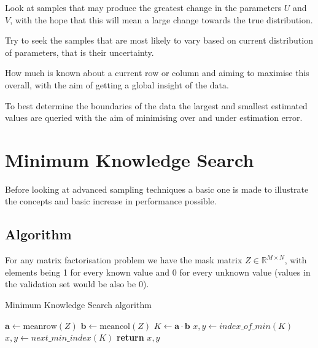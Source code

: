 \begin{description}[style=standard,leftmargin=.7cm,font=\bfseries]
  \item[Model] Look at samples that may produce the greatest change in the parameters $U$ and $V$, with the hope that this will mean a large change towards the true distribution.
  \item[Sample Uncertainty] Try to seek the samples that are most likely to vary based on current distribution of parameters, that is their uncertainty.
  \item[Knowledge] How much is known about a current row or column and aiming to maximise this overall, with the aim of getting a global insight of the data.
  \item[Max-Minimum] To best determine the boundaries of the data the largest and smallest estimated values are queried with the aim of minimising over and under estimation error.
\end{description}


\section{Minimum Knowledge Search}
\label{sec:mks_alg}
Before looking at advanced sampling techniques a basic one is made to illustrate the concepts and basic increase in performance possible.
\subsection{Algorithm}
For any matrix factorisation problem we have the mask matrix $Z \in \mathbb{R}^{M \times N}$, with elements being 1 for every known value and 0 for every unknown value (values in the validation set would be also be $0$).

\begin{algorithm}
\caption{Minimum Knowledge Search algorithm}\label{alg:min_knowl}
\begin{algorithmic}[1]
\State $\mathbf{a} \gets \text{meanrow}(Z)$ 
\State $\mathbf{b} \gets \text{meancol}(Z)$ 
\State $K \gets \mathbf{a} \cdot \mathbf{b}$ 
\State $x,y \gets index\_of\_min(K)$ 
\State $x,y \gets next\_min\_index(K)$
\EndWhile
\State \textbf{return} $x,y$
\EndProcedure
\end{algorithmic}
\end{algorithm}

